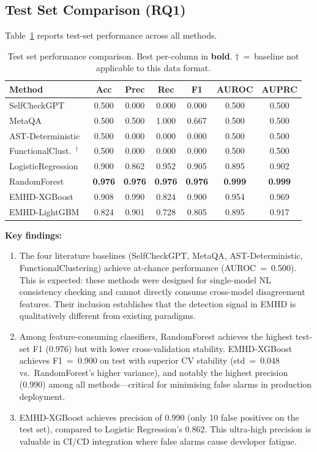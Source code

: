 \documentclass[11pt,a4paper]{article}
\newcommand{\method}{\textsc{EMHD}}
\begin{document}
\subsection{Test Set Comparison (RQ1)}

Table~\ref{tab:comparison} reports test-set performance across all methods.

\begin{table}[t]
\centering
\caption{Test set performance comparison. Best per-column in \textbf{bold}. $\dagger$~=~baseline not applicable to this data format.}
\label{tab:comparison}
\footnotesize
\begin{tabular}{lcccccc}
\toprule
\textbf{Method} & \textbf{Acc} & \textbf{Prec} & \textbf{Rec} & \textbf{F1} & \textbf{AUROC} & \textbf{AUPRC} \\
\midrule
SelfCheckGPT~\cite{manakul2023selfcheckgpt}     & 0.500 & 0.000 & 0.000 & 0.000 & 0.500 & 0.500 \\
MetaQA~\cite{yang2025metaqa}                     & 0.500 & 0.500 & 1.000 & 0.667 & 0.500 & 0.500 \\
AST-Deterministic~\cite{khati2026ast}            & 0.500 & 0.000 & 0.000 & 0.000 & 0.500 & 0.500 \\
FunctionalClust.~\cite{ravuri2025clustering}$^\dagger$ & 0.500 & 0.000 & 0.000 & 0.000 & 0.500 & 0.500 \\
\midrule
LogisticRegression & 0.900 & 0.862 & 0.952 & 0.905 & 0.895 & 0.902 \\
RandomForest       & \textbf{0.976} & \textbf{0.976} & \textbf{0.976} & \textbf{0.976} & \textbf{0.999} & \textbf{0.999} \\
\midrule
EMHD-XGBoost  & 0.908 & 0.990 & 0.824 & 0.900 & 0.954 & 0.969 \\
EMHD-LightGBM & 0.824 & 0.901 & 0.728 & 0.805 & 0.895 & 0.917 \\
\bottomrule
\end{tabular}
\end{table}

\noindent\textbf{Key findings:}
\begin{enumerate}
\item The four literature baselines (SelfCheckGPT, MetaQA, AST-Deterministic, FunctionalClustering) achieve at-chance performance (AUROC~=~0.500). This is expected: these methods were designed for single-model NL consistency checking and cannot directly consume cross-model disagreement features. Their inclusion establishes that the detection signal in \method{} is qualitatively different from existing paradigms.
\item Among feature-consuming classifiers, RandomForest achieves the highest test-set F1 (0.976) but with lower cross-validation stability. EMHD-XGBoost achieves F1~=~0.900 on test with superior CV stability (std~=~0.048 vs.\ RandomForest's higher variance), and notably the highest precision (0.990) among all methods---critical for minimising false alarms in production deployment.
\item EMHD-XGBoost achieves precision of 0.990 (only 10 false positives on the test set), compared to Logistic Regression's 0.862. This ultra-high precision is valuable in CI/CD integration where false alarms cause developer fatigue.
\end{enumerate}
\end{document}
